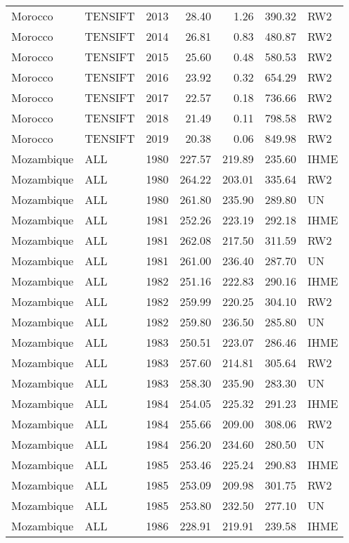 \begin{longtable}{lllrrrl}
  Morocco & TENSIFT & 2013 & 28.40 & 1.26 & 390.32 & RW2 \\ 
  Morocco & TENSIFT & 2014 & 26.81 & 0.83 & 480.87 & RW2 \\ 
  Morocco & TENSIFT & 2015 & 25.60 & 0.48 & 580.53 & RW2 \\ 
  Morocco & TENSIFT & 2016 & 23.92 & 0.32 & 654.29 & RW2 \\ 
  Morocco & TENSIFT & 2017 & 22.57 & 0.18 & 736.66 & RW2 \\ 
  Morocco & TENSIFT & 2018 & 21.49 & 0.11 & 798.58 & RW2 \\ 
  Morocco & TENSIFT & 2019 & 20.38 & 0.06 & 849.98 & RW2 \\ 
  Mozambique & ALL & 1980 & 227.57 & 219.89 & 235.60 & IHME \\ 
  Mozambique & ALL & 1980 & 264.22 & 203.01 & 335.64 & RW2 \\ 
  Mozambique & ALL & 1980 & 261.80 & 235.90 & 289.80 & UN \\ 
  Mozambique & ALL & 1981 & 252.26 & 223.19 & 292.18 & IHME \\ 
  Mozambique & ALL & 1981 & 262.08 & 217.50 & 311.59 & RW2 \\ 
  Mozambique & ALL & 1981 & 261.00 & 236.40 & 287.70 & UN \\ 
  Mozambique & ALL & 1982 & 251.16 & 222.83 & 290.16 & IHME \\ 
  Mozambique & ALL & 1982 & 259.99 & 220.25 & 304.10 & RW2 \\ 
  Mozambique & ALL & 1982 & 259.80 & 236.50 & 285.80 & UN \\ 
  Mozambique & ALL & 1983 & 250.51 & 223.07 & 286.46 & IHME \\ 
  Mozambique & ALL & 1983 & 257.60 & 214.81 & 305.64 & RW2 \\ 
  Mozambique & ALL & 1983 & 258.30 & 235.90 & 283.30 & UN \\ 
  Mozambique & ALL & 1984 & 254.05 & 225.32 & 291.23 & IHME \\ 
  Mozambique & ALL & 1984 & 255.66 & 209.00 & 308.06 & RW2 \\ 
  Mozambique & ALL & 1984 & 256.20 & 234.60 & 280.50 & UN \\ 
  Mozambique & ALL & 1985 & 253.46 & 225.24 & 290.83 & IHME \\ 
  Mozambique & ALL & 1985 & 253.09 & 209.98 & 301.75 & RW2 \\ 
  Mozambique & ALL & 1985 & 253.80 & 232.50 & 277.10 & UN \\ 
  Mozambique & ALL & 1986 & 228.91 & 219.91 & 239.58 & IHME \\ 

\end{longtable}
